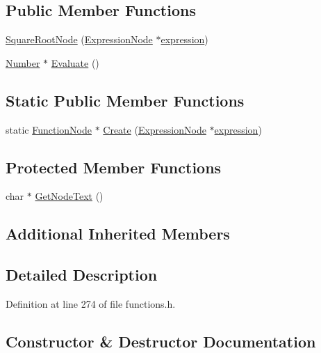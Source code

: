 \subsection*{Public Member Functions}
\begin{DoxyCompactItemize}
\item 
\hyperlink{classSquareRootNode_a142f55df3e155f5611cf9c0c42d9312f}{Square\+Root\+Node} (\hyperlink{classExpressionNode}{Expression\+Node} $\ast$\hyperlink{classFunctionNode_ad7577b179a1937aaf8a0058bb5b546dc}{expression})
\item 
\hyperlink{structNumber}{Number} $\ast$ \hyperlink{classSquareRootNode_a2c520265ea3c5174f5b52bba3c4e9050}{Evaluate} ()
\end{DoxyCompactItemize}
\subsection*{Static Public Member Functions}
\begin{DoxyCompactItemize}
\item 
static \hyperlink{classFunctionNode}{Function\+Node} $\ast$ \hyperlink{classSquareRootNode_ad4e2da219f372ffdaddb250c9ca5d47e}{Create} (\hyperlink{classExpressionNode}{Expression\+Node} $\ast$\hyperlink{classFunctionNode_ad7577b179a1937aaf8a0058bb5b546dc}{expression})
\end{DoxyCompactItemize}
\subsection*{Protected Member Functions}
\begin{DoxyCompactItemize}
\item 
char $\ast$ \hyperlink{classSquareRootNode_aacdecb56100335c99c1469aaae14e871}{Get\+Node\+Text} ()
\end{DoxyCompactItemize}
\subsection*{Additional Inherited Members}


\subsection{Detailed Description}


Definition at line 274 of file functions.\+h.



\subsection{Constructor \& Destructor Documentation}

